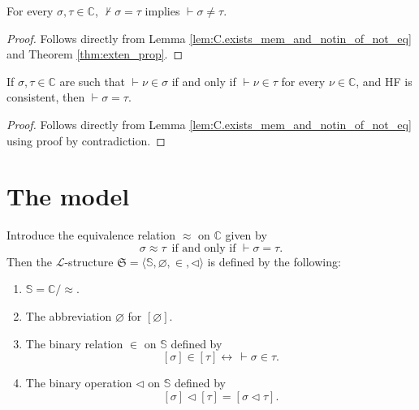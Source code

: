 \begin{corollary}
    \label{cor:C.ne_of_not_eq}
    \leanok
    For every $\sigma, \tau \in \mathbb{C}$, $\not\vdash \sigma = \tau$ implies 
    $\vdash \sigma \neq \tau$.
\end{corollary}

\begin{proof}
    \leanok
    Follows directly from Lemma \ref{lem:C.exists_mem_and_notin_of_not_eq} and 
    Theorem \ref{thm:exten_prop}.
\end{proof}

\begin{corollary}
    \label{cor:C.eq_of_forall_mem_iff_mem}
    \leanok
    If $\sigma, \tau \in \mathbb{C}$ are such that $\vdash \nu \in \sigma$ if and only if
    $\vdash \nu \in \tau$ for every $\nu \in \mathbb{C}$, and HF is consistent, 
    then $\vdash \sigma = \tau$.
\end{corollary}

\begin{proof}
    \leanok
    Follows directly from Lemma \ref{lem:C.exists_mem_and_notin_of_not_eq} 
    using proof by contradiction.
\end{proof}

\section{The model}

\begin{definition}
    \label{def:stdModel}
    \leanok
    Introduce the equivalence relation $\approx$ on $\mathbb{C}$ given by
    $$
    \sigma \approx \tau \,\text{ if and only if } \vdash \sigma = \tau.
    $$
    Then the $\mathcal{L}$-structure 
    $\mathfrak{S} = \langle\mathbb{S}, \varnothing, \in, \lhd \rangle$ is defined by the following:
    \begin{enumerate}
        \item $\mathbb{S} = \mathbb{C}/{\approx}$.
        \item The abbreviation $\varnothing$ for $[\varnothing]$.
        \item The binary relation $\in$ on $\mathbb{S}$ defined by
                $$[\sigma] \in [\tau] \leftrightarrow \,\vdash \sigma \in \tau.$$
        \item The binary operation $\lhd$ on $\mathbb{S}$ defined by
                $$[\sigma] \lhd [\tau] = [\sigma \lhd \tau].$$
    \end{enumerate}
\end{definition}

